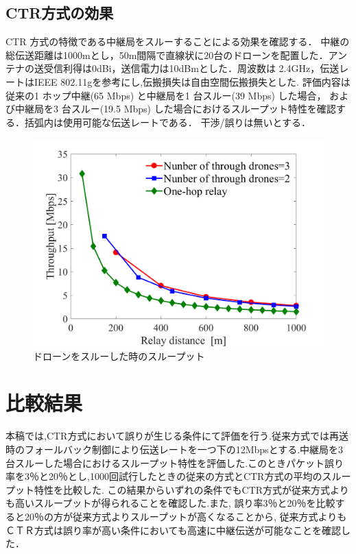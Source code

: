 \documentclass[a4paper,10pt]{ltjsarticle}
\begin{document}
\subsection{CTR方式の効果}
CTR 方式の特徴である中継局をスルーすることによる効果を確認する．
中継の総伝送距離は1000mとし，50m間隔で直線状に20台のドローンを配置した．アンテナの送受信利得は0dBi，送信電力は10dBmとした．周波数は 2.4GHz，伝送レートはIEEE 802.11gを参考にし,伝搬損失は自由空間伝搬損失とした.
評価内容は従来の1 ホップ中継(65 Mbps) と中継局を1 台スルー(39 Mbps) した場合，
および中継局を3 台スルー(19.5 Mbps) した場合におけるスループット特性を確認する．括弧内は使用可能な伝送レートである．
干渉/誤りは無いとする．
\begin{figure}[H]
  \centering
  \includegraphics[width=\linewidth]{throughtput_vs_placement_50m_max_distance_3.png} %
  \caption{ドローンをスルーした時のスループット}
  \label{fig:Throughput_through} %
\end{figure}
\section{比較結果}
本稿では,CTR方式において誤りが生じる条件にて評価を行う.従来方式では再送時のフォールバック制御により伝送レートを一つ下の12Mbpsとする.中継局を3台スルーした場合におけるスループット特性を評価した.このときパケット誤り率を3％と20％とし,1000回試行したときの従来の方式とCTR方式の平均のスループット特性を比較した.
この結果からいずれの条件でもCTR方式が従来方式よりも高いスループットが得られることを確認した.また, 誤り率3％と20％を比較すると20％の方が従来方式よりスループットが高くなることから, 従来方式よりもＣＴＲ方式は誤り率が高い条件においても高速に中継伝送が可能なことを確認した．
\end{document}
